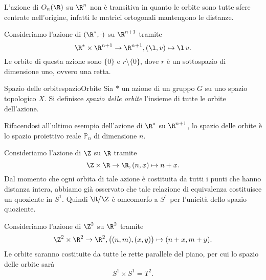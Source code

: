 \begin{ese}
	L'azione di \(O_n(\R)\) su \(\R^n\) non è transitiva in quanto le orbite sono tutte sfere centrate nell'origine, infatti le matrici ortogonali mantengono le distanze.
\end{ese}

\begin{ese}
	Consideriamo l'azione di \((\R^*,\cdot)\) su \(\R^{n+1}\) tramite
	\[
		\R^* \times \R^{n+1} \to \R^{n+1}, (\l,v) \mapsto \l\,v.
	\]
	Le orbite di questa azione sono \(\{0\}\) e \(r\setminus\{0\}\), dove \(r\) è un sottospazio di dimensione uno, ovvero una retta.
\end{ese}

\begin{defn}{Spazio delle orbite}{spazioOrbite}
	Sia \(*\) un azione di un gruppo \(G\) su uno spazio topologico \(X\).
	Si definisce \emph{spazio delle orbite} l'insieme di tutte le orbite dell'azione.
\end{defn}

\begin{ese}
	Rifacendosi all'ultimo esempio dell'azione di \(\R^*\) su \(\R^{n+1}\), lo spazio delle orbite è lo spazio proiettivo reale \(\mathbb{P}_n\) di dimensione \(n\).
\end{ese}

\begin{ese}
	Consideriamo l'azione di \(\Z\) su \(\R\) tramite
	\[
		\Z \times \R \to \R, (n,x)\mapsto n+x.
	\]
	Dal momento che ogni orbita di tale azione è costituita da tutti i punti che hanno distanza intera, abbiamo già osservato che tale relazione di equivalenza costituisce un quoziente in \(S^1\).
	Quindi \(\R/\Z\) è omeomorfo a \(S^1\) per l'unicità dello spazio quoziente.
\end{ese}

\begin{ese}
	Consideriamo l'azione di \(\Z^2\) su \(\R^2\) tramite
	\[
		\Z^2 \times \R^2 \to \R^2, \big( (n,m),(x,y) \big)\mapsto (n+x,m+y).
	\]
	Le orbite saranno costituite da tutte le rette parallele del piano, per cui lo spazio delle orbite sarà
	\[
		S^1 \times S^1 = T^2.
	\]
\end{ese}